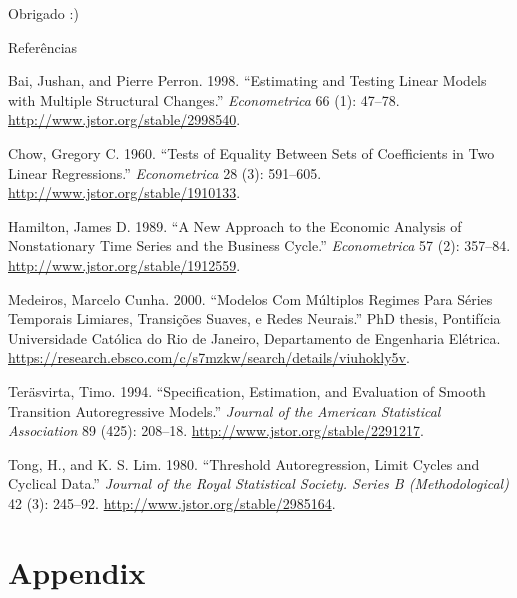 \documentclass[
  ignorenonframetext,
]{beamer}
\newlength{\cslhangindent}
\newenvironment{CSLReferences}[2] %
 {\begin{list}{}{%
  \setlength{\itemindent}{0pt}
  \setlength{\leftmargin}{0pt}
  \setlength{\parsep}{0pt}
  \ifodd #1
   \setlength{\leftmargin}{\cslhangindent}
   \setlength{\itemindent}{-1\cslhangindent}
  \fi
  \setlength{\itemsep}{#2\baselineskip}}}
 {\end{list}}
\begin{document}
\begin{frame}
\begin{center}
\Huge Obrigado :)
\end{center}
\end{frame}

\begin{frame}{Referências}
\label{referuxeancias}
\label{refs}
\begin{CSLReferences}{1}{0}
Bai, Jushan, and Pierre Perron. 1998. {``Estimating and Testing Linear
Models with Multiple Structural Changes.''} \emph{Econometrica} 66 (1):
47--78. \url{http://www.jstor.org/stable/2998540}.

Chow, Gregory C. 1960. {``Tests of Equality Between Sets of Coefficients
in Two Linear Regressions.''} \emph{Econometrica} 28 (3): 591--605.
\url{http://www.jstor.org/stable/1910133}.

Hamilton, James D. 1989. {``A New Approach to the Economic Analysis of
Nonstationary Time Series and the Business Cycle.''} \emph{Econometrica}
57 (2): 357--84. \url{http://www.jstor.org/stable/1912559}.

Medeiros, Marcelo Cunha. 2000. {``Modelos Com Múltiplos Regimes Para
Séries Temporais Limiares, Transições Suaves, e Redes Neurais.''} PhD
thesis, Pontifícia Universidade Católica do Rio de Janeiro, Departamento
de Engenharia Elétrica.
\url{https://research.ebsco.com/c/s7mzkw/search/details/viuhokly5v}.

Teräsvirta, Timo. 1994. {``Specification, Estimation, and Evaluation of
Smooth Transition Autoregressive Models.''} \emph{Journal of the
American Statistical Association} 89 (425): 208--18.
\url{http://www.jstor.org/stable/2291217}.

Tong, H., and K. S. Lim. 1980. {``Threshold Autoregression, Limit Cycles
and Cyclical Data.''} \emph{Journal of the Royal Statistical Society.
Series B (Methodological)} 42 (3): 245--92.
\url{http://www.jstor.org/stable/2985164}.

\end{CSLReferences}
\end{frame}

\section{Appendix}\label{appendix}
\end{document}
